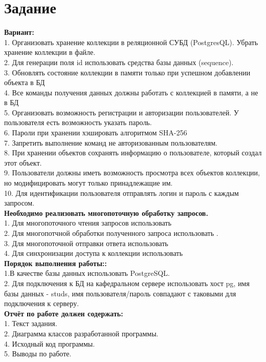 \section{Задание}

\textbf{Вариант: } \\
	1. Организовать хранение коллекции в реляционной СУБД (PostgresQL). Убрать хранение коллекции в файле.\\
	2. Для генерации поля id использовать средства базы данных (sequence).\\
	3. Обновлять состояние коллекции в памяти только при успешном добавлении объекта в БД\\
	4. Все команды получения данных должны работать с коллекцией в памяти, а не в БД\\
	5. Организовать возможность регистрации и авторизации пользователей. У пользователя есть возможность указать пароль.\\
	6. Пароли при хранении хэшировать алгоритмом SHA-256\\
	7. Запретить выполнение команд не авторизованным пользователям.\\
	8. При хранении объектов сохранять информацию о пользователе, который создал этот объект.\\
	9. Пользователи должны иметь возможность просмотра всех объектов коллекции, но модифицировать могут только принадлежащие им.\\
	10. Для идентификации пользователя отправлять логин и пароль с каждым запросом.\\

\textbf{Необходимо реализовать многопоточную обработку запросов.}\\
	1. Для многопоточного чтения запросов использовать\\
	2. Для многопотчной обработки полученного запроса использовать .\\
	3. Для многопоточной отправки ответа использовать\\
	4. Для синхронизации доступа к коллекции использовать\\
	

\textbf{Порядок выполнения работы::}\\
	1.В качестве базы данных использовать PostgreSQL.\\
	2. Для подключения к БД на кафедральном сервере использовать хост pg, имя базы данных - studs, имя пользователя/пароль совпадают с таковыми для подключения к серверу.\\
\textbf{Отчёт по работе должен содержать:} \\
	1. Текст задания.\\
	2. Диаграмма классов разработанной программы.\\
	4. Исходный код программы.\\
	5. Выводы по работе.\\
	
